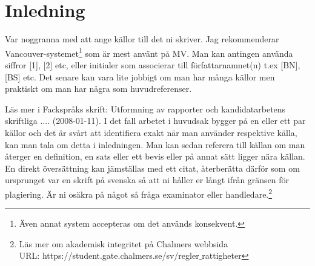 \documentclass[../rapport_MVEX01-11-05]{subfiles}
\begin{document}
\section{Inledning}
Var noggranna med att ange källor till det ni skriver. Jag
rekommenderar Vancouver-systemet\footnote{Även annat system accepteras
om det används konsekvent.} som är mest använt på MV. Man kan antingen
använda siffror [1], [2] etc, eller initialer som associerar till
författarnamnet(n) t.ex [BN], [BS] etc. Det senare kan vara lite
jobbigt om man har många källor men praktiskt om man har några som
huvudreferenser.

Läs mer i Fackspråks skrift: Utformning av rapporter och
kandidatarbetens skriftliga .... (2008-01-11)\cite{rapp}.
I det fall arbetet i huvudsak bygger på en eller ett par källor och
det är svårt att identifiera exakt när man använder respektive källa,
kan man tala om detta i inledningen. Man kan sedan referera till
källan om man återger en definition, en sats eller ett bevis eller på
annat sätt ligger nära källan. En direkt översättning kan jämställas
med ett citat, återberätta därför som om ursprunget var en skrift på
svenska så att ni håller er långt ifrån gränsen för plagiering. Är ni
osäkra på något så fråga examinator eller handledare.\footnote{Läs mer
om akademisk integritet på Chalmers webbsida \hfill \\ URL:
https://student.gate.chalmers.se/sv/regler$\_$rattigheter}

\end{document}
